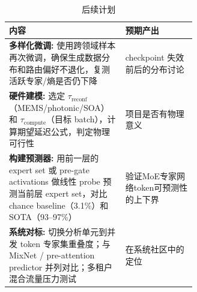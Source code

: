 \documentclass{sjtuweekly}
\begin{document}
\begin{table}[H]
\centering
\small
\begin{tabularx}{\linewidth}{@{}>{\raggedright\arraybackslash}p{0.62\linewidth}>{\centering\arraybackslash}X@{}}
\toprule
\textbf{内容} & \textbf{预期产出} \\
\midrule
\textbf{多样化微调:} 使用跨领域样本再次微调，确保生成数据分布和路由偏好不退化，复测活跃专家/熵是否仍下降 & checkpoint 失效前后的分布讨论 \\
\textbf{硬件建模:} 选定 $\tau_{\text{reconf}}$（MEMS/photonic/SOA）和 $\tau_{\text{compute}}$（目标 batch），计算期望延迟公式，判定物理可行性 & 项目是否有物理意义 \\
\textbf{构建预测器:} 用前一层的 expert set 或 pre-gate activations 做线性 probe 预测当前层 expert set，对比 chance baseline（3.1\%）和 SOTA（93--97\%） & 验证MoE专家网络token可预测性的上下界 \\
\textbf{系统对标:} 切换分析单元到并发 token 专家集重叠度；与 MixNet / pre-attention predictor 并列对比；多租户混合流量压力测试 & 在系统社区中的定位 \\
\bottomrule
\end{tabularx}

\caption{后续计划}
\label{tab:plan}
\end{table}


\printbib
\end{document}
